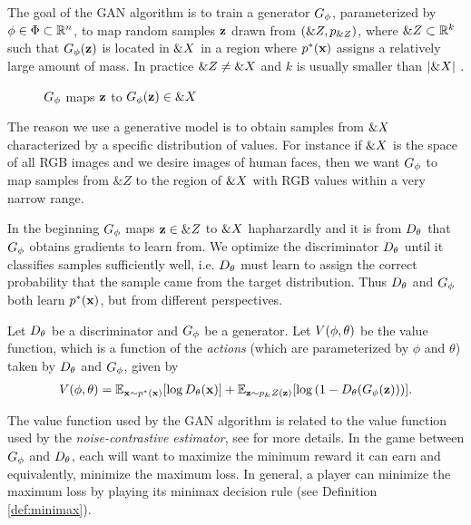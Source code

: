 The goal of the GAN algorithm is to train a generator $G_\phi$,
parameterized by $\phi \in \Phi \subset \mathbb{R}^n$, to map random samples
$\mathbf{z}$ drawn from $(\&Z, p_{\&Z})$, where $\&Z \subset \mathbb{R}^k$
such that $G_\phi(\mathbf{z})$ is located in $\&X$ in a region where $p^*(\mathbf{x})$
assigns a relatively large amount of mass. In practice
$\&Z \not = \&X$ and $k$ is usually smaller than $|\&X|$
\cite{ref:arjovsky-2017}.

\begin{figure}[H] \centering
  \caption{$G_\phi$ maps $\mathbf{z}$ to $G_\phi(\mathbf{z}) \in \&X$}
  \label{fig:g-maps}
\end{figure}

The reason we use a generative model is to obtain samples from
$\&X$ characterized by a specific distribution of values. For
instance if $\&X$ is the space of all RGB images and we desire
images of human faces, then we want $G_\phi$ to map samples from $\&Z$ to
the region of $\&X$ with RGB values within a very narrow range.

In the beginning $G_\phi$ maps $\mathbf{z} \in \&Z$ to $\&X$ hapharzardly and
it is from $D_\theta$ that $G_\phi$ obtains gradients to learn from. We optimize
the discriminator $D_\theta$ until it classifies samples sufficiently well,
i.e. $D_\theta$ must learn to assign the correct probability that the sample
came from the target distribution. Thus $D_\theta$ and $G_\phi$ both learn
$p^*(\mathbf{x})$, but from different perspectives.

Let $D_\theta$ be a discriminator and $G_\phi$ be a generator. Let $V(\phi, \theta)$ be the
value function, which is a function of the \textit{actions} (which are
parameterized by $\phi$ and $\theta$) taken by $D_\theta$ and $G_\phi$, given by
\begin{align}
  \label{eq:the-original-objective-function}
  V(\phi, \theta) = \mathbb{E}_{\mathbf{x} \sim p^*(\mathbf{x})}[{\log D_\theta(\mathbf{x}})] +
  \mathbb{E}_{\mathbf{z} \sim p_\&Z(\mathbf{z})}[\log{(1 - D_\theta(G_\phi(\mathbf{z})))}].
\end{align}

The value function used by the GAN algorithm is related to the value
function used by the \textit{noise-contrastive estimator}, see
\cite{ref:gutmann-2010} for more details. In the game between $G_\phi$ and
$D_\theta$, each will want to maximize the minimum reward it can earn and
equivalently, minimize the maximum loss. In general, a player can
minimize the maximum loss by playing its minimax decision rule (see
Definition \ref{def:minimax}).

